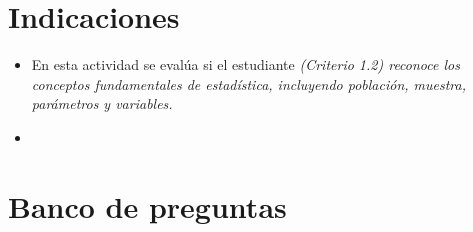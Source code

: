 \documentclass[a4,11pt]{aleph-notas}
\begin{document}
\encabezado

\vspace*{-8mm}
\section{Indicaciones}

\begin{itemize}[leftmargin=*]
\item 
    En esta actividad se evalúa si el estudiante \textit{(Criterio 1.2) reconoce los conceptos fundamentales de estadística, incluyendo población, muestra, parámetros y variables.}
\item
    
\end{itemize}

\section{Banco de preguntas}
\end{document}
